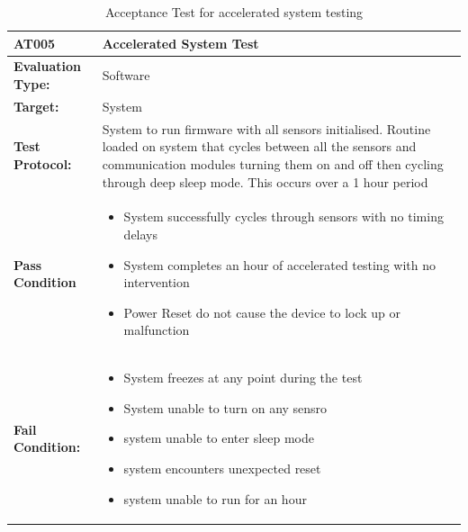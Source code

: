 \begin{table}[H]
	\centering
	\caption{Acceptance Test for accelerated system testing}
	\begin{tabular}{|m{}|m{}|}
		\hline
		\textbf{AT005 }& \textbf{Accelerated System Test} \\
		\hline
		\textbf{Evaluation Type:} & Software \\
		\hline
		\textbf{Target: } & System \\
		\hline
		\textbf{Test Protocol:} &  System to run firmware with all sensors initialised. Routine loaded on system that cycles between all the sensors and communication modules turning them on and off then cycling through deep sleep mode. This occurs over a 1 hour period\\
		\hline
		\textbf{Pass Condition} & \vspace{5pt} \begin{itemize}
			\item System successfully cycles through sensors with no timing delays
			\item System completes an hour of accelerated testing with no intervention
			\item Power Reset do not cause the device to lock up or malfunction
		\end{itemize} \\
		\hline
		\textbf{Fail Condition:} & \vspace{5pt} \begin{itemize}
			\item System freezes at any point during the test 
			\item System unable to turn on any sensro
			\item system unable to enter sleep mode
			\item system encounters unexpected reset
			\item system unable to run for an hour
		\end{itemize}\\
		\hline
	\end{tabular}
	
	\label{tab:AT005}
\end{table}

